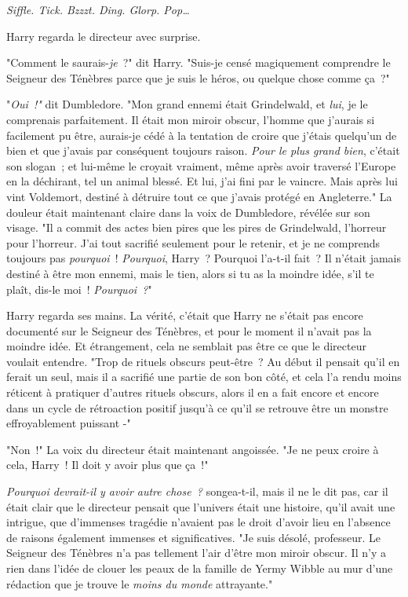 \later

\emph{Siffle. Tick. Bzzzt. Ding. Glorp. Pop…}

Harry regarda le directeur avec surprise.

"Comment le saurais-\emph{je}~?" dit Harry. "Suis-je censé magiquement comprendre le Seigneur des Ténèbres parce que je suis le héros, ou quelque chose comme ça~?"

"\emph{Oui~!"} dit Dumbledore. "Mon grand ennemi était Grindelwald, et \emph{lui}, je le comprenais parfaitement. Il était mon miroir obscur, l'homme que j'aurais si facilement pu être, aurais-je cédé à la tentation de croire que j'étais quelqu'un de bien et que j'avais par conséquent toujours raison. \emph{Pour le plus grand bien}, c'était son slogan~; et lui-même le croyait vraiment, même après avoir traversé l'Europe en la déchirant, tel un animal blessé. Et lui, j'ai fini par le vaincre. Mais après lui vint Voldemort, destiné à détruire tout ce que j'avais protégé en Angleterre." La douleur était maintenant claire dans la voix de Dumbledore, révélée sur son visage. "Il a commit des actes bien pires que les pires de Grindelwald, l'horreur pour l'horreur. J'ai tout sacrifié seulement pour le retenir, et je ne comprends toujours pas \emph{pourquoi}~! \emph{Pourquoi}, Harry~? Pourquoi l'a-t-il fait~? Il n'était jamais destiné à être mon ennemi, mais le tien, alors si tu as la moindre idée, s'il te plaît, dis-le moi~! \emph{Pourquoi~?}"

Harry regarda ses mains. La vérité, c'était que Harry ne s'était pas encore documenté sur le Seigneur des Ténèbres, et pour le moment il n'avait pas la moindre idée. Et étrangement, cela ne semblait pas être ce que le directeur voulait entendre. "Trop de rituels obscurs peut-être~? Au début il pensait qu'il en ferait un seul, mais il a sacrifié une partie de son bon côté, et cela l'a rendu moins réticent à pratiquer d'autres rituels obscurs, alors il en a fait encore et encore dans un cycle de rétroaction positif jusqu'à ce qu'il se retrouve être un monstre effroyablement puissant -"

"Non~!" La voix du directeur était maintenant angoissée. "Je ne peux croire à cela, Harry~! Il doit y avoir plus que ça~!"

\emph{Pourquoi devrait-il y avoir autre chose~?} songea-t-il, mais il ne le dit pas, car il était clair que le directeur pensait que l'univers était une histoire, qu'il avait une intrigue, que d'immenses tragédie n'avaient pas le droit d'avoir lieu en l'absence de raisons également immenses et significatives. "Je suis désolé, professeur. Le Seigneur des Ténèbres n'a pas tellement l'air d'être mon miroir obscur. Il n'y a rien dans l'idée de clouer les peaux de la famille de Yermy Wibble au mur d'une rédaction que je trouve le \emph{moins du monde} attrayante."


